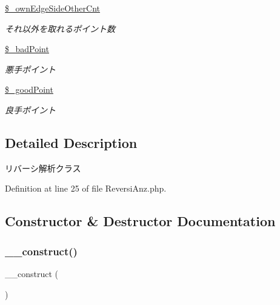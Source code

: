 \begin{DoxyCompactItemize}
\mbox{\label{class_reversi_anz_ac1532291c809b3924ea2f4fafddfdc8c}} 
\hyperlink{class_reversi_anz_ac1532291c809b3924ea2f4fafddfdc8c}{\$\+\_\+own\+Edge\+Side\+Other\+Cnt}
\begin{DoxyCompactList}\small\item\em それ以外を取れるポイント数 \end{DoxyCompactList}\item 
\mbox{\label{class_reversi_anz_a325823c6f74529902667f01e8cfb62ca}} 
\hyperlink{class_reversi_anz_a325823c6f74529902667f01e8cfb62ca}{\$\+\_\+bad\+Point}
\begin{DoxyCompactList}\small\item\em 悪手ポイント \end{DoxyCompactList}\item 
\mbox{\label{class_reversi_anz_a311c8f84b5ca7f222d3c84c1e6251191}} 
\hyperlink{class_reversi_anz_a311c8f84b5ca7f222d3c84c1e6251191}{\$\+\_\+good\+Point}
\begin{DoxyCompactList}\small\item\em 良手ポイント \end{DoxyCompactList}\end{DoxyCompactItemize}


\subsection{Detailed Description}
リバーシ解析クラス 

Definition at line 25 of file Reversi\+Anz.\+php.



\subsection{Constructor \& Destructor Documentation}
\mbox{\label{class_reversi_anz_a095c5d389db211932136b53f25f39685}} 
\subsubsection{\texorpdfstring{\+\_\+\+\_\+construct()}{\_\_construct()}}
{\footnotesize\ttfamily \+\_\+\+\_\+construct (\begin{DoxyParamCaption}{ }\end{DoxyParamCaption})}



